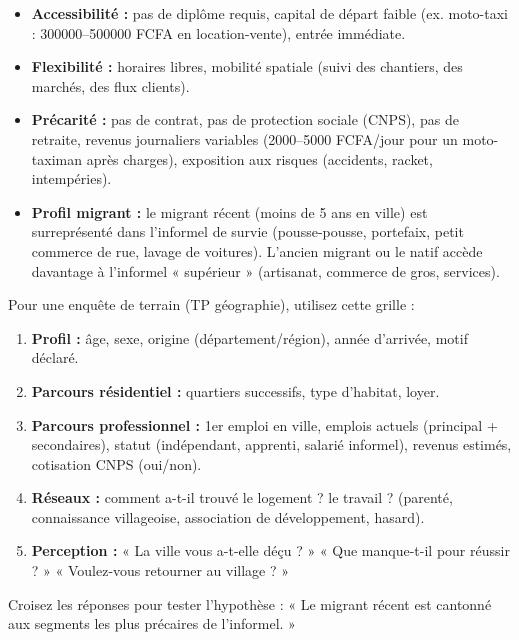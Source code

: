 \documentclass[11pt]{article}
\begin{document}
\begin{aretenir}
\begin{itemize}
    \item \textbf{Accessibilité :} pas de diplôme requis, capital de départ faible (ex. moto-taxi : \num{300 000}--\num{500 000} FCFA en location-vente), entrée immédiate.
    \item \textbf{Flexibilité :} horaires libres, mobilité spatiale (suivi des chantiers, des marchés, des flux clients).
    \item \textbf{Précarité :} pas de contrat, pas de protection sociale (CNPS), pas de retraite, revenus journaliers variables (\num{2 000}--\num{5 000} FCFA/jour pour un moto-taximan après charges), exposition aux risques (accidents, racket, intempéries).
    \item \textbf{Profil migrant :} le migrant récent (moins de 5 ans en ville) est surreprésenté dans l'informel de survie (pousse-pousse, portefaix, petit commerce de rue, lavage de voitures). L'ancien migrant ou le natif accède davantage à l'informel « supérieur » (artisanat, commerce de gros, services).
\end{itemize}
\end{aretenir}

\begin{methode}
Pour une enquête de terrain (TP géographie), utilisez cette grille :
\begin{enumerate}
    \item \textbf{Profil :} âge, sexe, origine (département/région), année d'arrivée, motif déclaré.
    \item \textbf{Parcours résidentiel :} quartiers successifs, type d'habitat, loyer.
    \item \textbf{Parcours professionnel :} 1er emploi en ville, emplois actuels (principal + secondaires), statut (indépendant, apprenti, salarié informel), revenus estimés, cotisation CNPS (oui/non).
    \item \textbf{Réseaux :} comment a-t-il trouvé le logement ? le travail ? (parenté, connaissance villageoise, association de développement, hasard).
    \item \textbf{Perception :} « La ville vous a-t-elle déçu ? » « Que manque-t-il pour réussir ? » « Voulez-vous retourner au village ? »
\end{enumerate}
Croisez les réponses pour tester l'hypothèse : « Le migrant récent est cantonné aux segments les plus précaires de l'informel. »
\end{methode}
\end{document}
